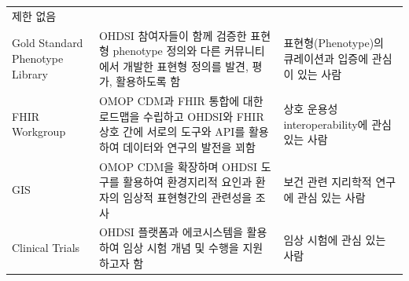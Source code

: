 \documentclass[10.5pt]{book}
\theoremstyle{definition}
\theoremstyle{definition}
\theoremstyle{definition}
\theoremstyle{remark}
\begin{document}
\begin{longtable}[]{@{}lll@{}}
\begin{minipage}[t]{0.37\columnwidth}
제한 없음\strut
\end{minipage}\tabularnewline
\begin{minipage}[t]{0.11\columnwidth}\raggedright\strut
Gold Standard Phenotype Library\strut
\end{minipage} & \begin{minipage}[t]{0.44\columnwidth}\raggedright\strut
OHDSI 참여자들이 함께 검증한 표현형 phenotype 정의와 다른 커뮤니티에서
개발한 표현형 정의를 발견, 평가, 활용하도록 함\strut
\end{minipage} & \begin{minipage}[t]{0.37\columnwidth}\raggedright\strut
표현형(Phenotype)의 큐레이션과 입증에 관심이 있는 사람\strut
\end{minipage}\tabularnewline
\begin{minipage}[t]{0.11\columnwidth}\raggedright\strut
FHIR Workgroup\strut
\end{minipage} & \begin{minipage}[t]{0.44\columnwidth}\raggedright\strut
OMOP CDM과 FHIR 통합에 대한 로드맵을 수립하고 OHDSI와 FHIR 상호 간에
서로의 도구와 API를 활용하여 데이터와 연구의 발전을 꾀함\strut
\end{minipage} & \begin{minipage}[t]{0.37\columnwidth}\raggedright\strut
상호 운용성 interoperability에 관심 있는 사람\strut
\end{minipage}\tabularnewline
\begin{minipage}[t]{0.11\columnwidth}\raggedright\strut
GIS\strut
\end{minipage} & \begin{minipage}[t]{0.44\columnwidth}\raggedright\strut
OMOP CDM을 확장하며 OHDSI 도구를 활용하여 환경지리적 요인과 환자의
임상적 표현형간의 관련성을 조사\strut
\end{minipage} & \begin{minipage}[t]{0.37\columnwidth}\raggedright\strut
보건 관련 지리학적 연구에 관심 있는 사람\strut
\end{minipage}\tabularnewline
\begin{minipage}[t]{0.11\columnwidth}\raggedright\strut
Clinical Trials\strut
\end{minipage} & \begin{minipage}[t]{0.44\columnwidth}\raggedright\strut
OHDSI 플랫폼과 에코시스템을 활용하여 임상 시험 개념 및 수행을 지원하고자
함\strut
\end{minipage} & \begin{minipage}[t]{0.37\columnwidth}\raggedright\strut
임상 시험에 관심 있는 사람\strut

\end{minipage}
\end{longtable}
\end{document}
